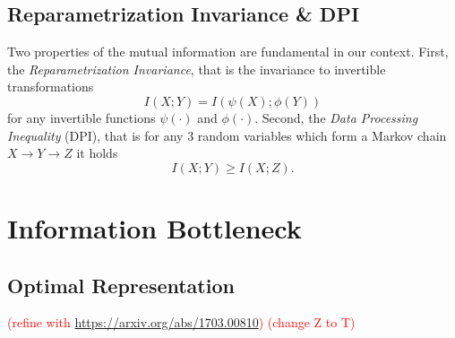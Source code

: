 \documentclass[11pt]{article}
\newcommand\myworries[1]{\textcolor{red}{(#1)}}
\begin{document}
\subsection*{Reparametrization Invariance \& DPI}

Two properties of the mutual information are fundamental in our context. First, the \textit{Reparametrization Invariance}, that is the invariance to invertible transformations
\begin{equation}
I(X;Y) = I(\psi(X); \phi(Y))
\end{equation}
for any invertible functions $\psi(\cdot)$ and $\phi(\cdot)$. Second, the \textit{Data Processing Inequality} (DPI), that is for any 3 random variables which form a Markov chain $X\rightarrow Y \rightarrow Z$ it holds
\begin{equation}
I(X;Y) \geq I(X;Z).
\label{eq:dpi}
\end{equation}

\section{Information Bottleneck}

\subsection*{Optimal Representation}


\myworries{refine with \url{https://arxiv.org/abs/1703.00810}}
\myworries{change Z to T}
\end{document}
